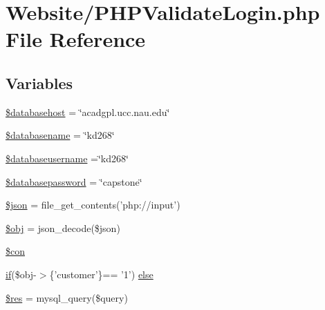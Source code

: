 \hypertarget{_p_h_p_validate_login_8php}{\section{Website/\-P\-H\-P\-Validate\-Login.php File Reference}
\label{_p_h_p_validate_login_8php}
}
\subsection*{Variables}
\begin{DoxyCompactItemize}
\item 
\hyperlink{_p_h_p_validate_login_8php_a034ead57b6864a4413371711e8d65372}{\$databasehost} = \char`\"{}acadgpl.\-ucc.\-nau.\-edu\char`\"{}
\item 
\hyperlink{_p_h_p_validate_login_8php_aace53f8afce81b52040cef0cd850138a}{\$databasename} = \char`\"{}kd268\char`\"{}
\item 
\hyperlink{_p_h_p_validate_login_8php_a251bf75f510d7c8b556c65d7c30e911f}{\$databaseusername} =\char`\"{}kd268\char`\"{}
\item 
\hyperlink{_p_h_p_validate_login_8php_a1a07536b6a5f43f2d8f826bd2ee6c91a}{\$databasepassword} = \char`\"{}capstone\char`\"{}
\item 
\hyperlink{_p_h_p_validate_login_8php_acedd13b51401130848ce18f4d5c52605}{\$json} = file\-\_\-get\-\_\-contents('php\-://input')
\item 
\hyperlink{_p_h_p_validate_login_8php_a9008ed94ba185855b1723e367744b87e}{\$obj} = json\-\_\-decode(\$json)
\item 
\hyperlink{_p_h_p_validate_login_8php_a0debe10448ec56a57b5509648408a549}{\$con}
\item 
\hyperlink{_m_c_mhome_page_8php_a8dec719c1645067d1065f7f064d4b967}{if}(\$obj-\/$>$\{'customer'\}== '1') \hyperlink{_p_h_p_validate_login_8php_ab6024c486eebf5823d5a9fddf2cbde2d}{else}
\item 
\hyperlink{_p_h_p_validate_login_8php_a49a8a4009b02e49717caa88b128affc5}{\$res} = mysql\-\_\-query(\$query)
\end{DoxyCompactItemize}


